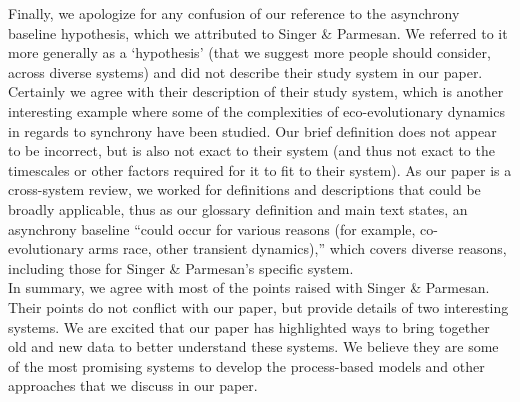 \documentclass[11pt,letter]{article}
\begin{document}
Finally, we apologize for any confusion of our reference to the asynchrony baseline hypothesis, which we attributed to Singer \& Parmesan. We referred to it more generally as a `hypothesis' (that we suggest more people should consider, across diverse systems) and did not describe their study system in our paper. Certainly we agree with their description of their study system, which is another interesting example where some of the complexities of eco-evolutionary dynamics in regards to synchrony have been studied. Our brief definition does not appear to be incorrect, but is also not exact to their system (and thus not exact to the timescales or other factors required for it to fit to their system).  As our paper is a cross-system review, we worked for definitions and descriptions that could be broadly applicable, thus as our glossary definition and main text states, an asynchrony baseline ``could occur for various reasons (for example, co-evolutionary arms race, other transient dynamics),'' which covers diverse reasons, including those for Singer \& Parmesan's specific system.\\

In summary, we agree with most of the points raised with Singer \& Parmesan. Their points do not conflict with our paper, but provide details of two interesting systems. We are excited that our paper has highlighted ways to bring together old and new data to better understand these systems. We believe they are some of the most promising systems to develop the process-based models and other approaches that we discuss in our paper. 
\end{document}
